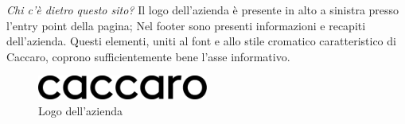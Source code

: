 \textit{Chi c'è dietro questo sito?}\newline
Il logo dell'azienda è presente in alto a sinistra presso l'entry point della pagina; Nel footer sono presenti informazioni e recapiti dell'azienda. Questi elementi, uniti al font e allo stile cromatico caratteristico di Caccaro, coprono sufficientemente bene l'asse informativo.

\begin{figure}[H]
  \centering
  \includegraphics[width=0.5\textwidth]{sez/HomePage/img/logo-caccaro.pdf}
  \caption[https://www.caccaro.com/]{Logo dell'azienda}
\end{figure}